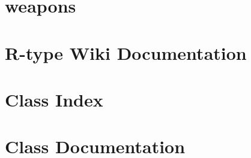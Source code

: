 \let\mypdfximage\pdfximage\def\pdfximage{\immediate\mypdfximage}\documentclass[twoside]{book}
\newcommand{\+}{\discretionary{\mbox{\scriptsize$\hookleftarrow$}}{}{}}
\newcommand{\clearemptydoublepage}{%
  \newpage{\pagestyle{empty}\cleardoublepage}%
}
\begin{document}
\chapter{weapons}
\label{md_weapons}

\chapter{R-\/type Wiki Documentation}
\label{md_wiki}

\chapter{Class Index}

\chapter{Class Documentation}





























\backmatter
\newpage
{}
\clearemptydoublepage
{}
\printindex
\end{document}
